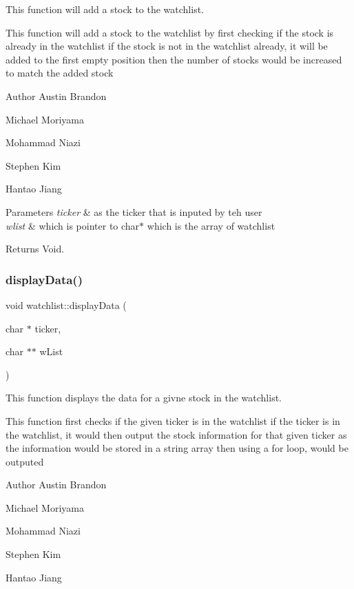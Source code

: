 This function will add a stock to the watchlist. 

This function will add a stock to the watchlist by first checking if the stock is already in the watchlist if the stock is not in the watchlist already, it will be added to the first empty position then the number of stocks would be increased to match the added stock

\begin{DoxyAuthor}{Author}
Austin Brandon 

Michael Moriyama 

Mohammad Niazi 

Stephen Kim 

Hantao Jiang 
\end{DoxyAuthor}

\begin{DoxyParams}{Parameters}
{\em ticker} & as the ticker that is inputed by teh user \\
\hline
{\em wlist} & which is pointer to char$\ast$ which is the array of watchlist \\
\hline
\end{DoxyParams}
\begin{DoxyReturn}{Returns}
Void. 
\end{DoxyReturn}
\mbox{\label{classwatchlist_aaae1b9ec02340e8cf7722fe1da575dc5}} 
\subsubsection{\texorpdfstring{display\+Data()}{displayData()}}
{\footnotesize\ttfamily void watchlist\+::display\+Data (\begin{DoxyParamCaption}\item[{char $\ast$}]{ticker,  }\item[{char $\ast$$\ast$}]{w\+List }\end{DoxyParamCaption})}



This function displays the data for a givne stock in the watchlist. 

This function first checks if the given ticker is in the watchlist if the ticker is in the watchlist, it would then output the stock information for that given ticker as the information would be stored in a string array then using a for loop, would be outputed \begin{DoxyAuthor}{Author}
Austin Brandon 

Michael Moriyama 

Mohammad Niazi 

Stephen Kim 

Hantao Jiang 
\end{DoxyAuthor}

